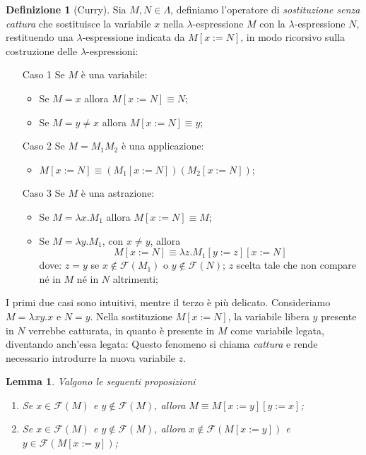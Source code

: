 \documentclass[a4paper,11pt]{article}
\newtheorem{lemma}{Lemma}
\theoremstyle{definition}
\newtheorem{defn}{Definizione}
\newcommand{\FF}{\mathcal{F}}
\begin{document}
\begin{defn}[Curry]
  Sia $M,N\in\Lambda$, definiamo l'operatore di \textit{sostituzione senza
  cattura} che sostituisce la variabile $x$ nella $\lambda$-espressione $M$ con la
  $\lambda$-espressione $N$, restituendo una $\lambda$-espressione indicata da
  $M[x:=N]$, in modo ricorsivo sulla costruzione delle $\lambda$-espressioni:
  \begin{itemize}
    \item[{Caso 1}] Se $M$ è una variabile:
      \begin{itemize}
        \item Se $M=x$ allora $M[x:=N]\equiv N$;
        \item Se $M=y\ne x$ allora $M[x:=N]\equiv y$;
      \end{itemize}
    \item[Caso 2] Se $M=M_1M_2$ è una applicazione:
      \begin{itemize}
        \item $M[x:=N]\equiv (M_1[x:=N])(M_2[x:=N])$; 
      \end{itemize}
    \item[Caso 3] Se $M$ è una astrazione:
      \begin{itemize}
        \item Se $M=\lambda x.M_1$ allora $M[x:=N] \equiv M$;
        \item Se $M =\lambda y.M_1$, con $x\ne y$, allora 
          \[
            M[x:=N] \equiv\lambda z.M_1[y:=z][x:=N]
          \]
          dove: $z=y$ se $x\not\in\FF(M_1)$ o
          $y\not\in \FF(N)$; $z$ scelta tale che non compare né in $M$ né in
          $N$ altrimenti;
      \end{itemize}
  \end{itemize}
\end{defn}
I primi due casi sono intuitivi, mentre il terzo è più delicato. Consideriamo
$M=\lambda xy.x$ e $N=y$. Nella sostituzione $M[x:=N]$, la variabile libera 
$y$ presente in $N$ verrebbe catturata, in quanto è presente in $M$ come variabile legata, 
diventando anch'essa legata: Questo fenomeno si chiama \textit{cattura} e rende
necessario introdurre la nuova variabile $z$.

\begin{lemma}
  Valgono le seguenti proposizioni
  \begin{enumerate}
    \item Se $x\in\FF(M)$ e $y\not\in\FF(M)$, allora $M\equiv M[x:=y][y:=x]$;
    \item Se $x\in\FF(M)$ e $y\not\in\FF(M)$, allora $x\not\in\FF(M[x:=y])$ e
      $y\in\FF(M[x:=y])$;
  \end{enumerate}
  \label{lem:sost}
\end{lemma}
\end{document}
